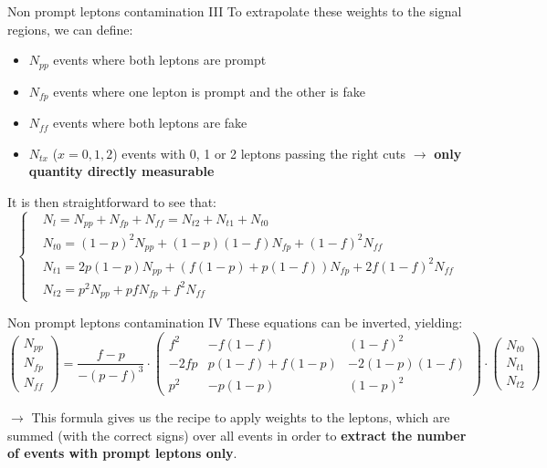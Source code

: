 \documentclass[8pt]{beamer}
\begin{document}
\begin{frame}{Non prompt leptons contamination III}
\justifying
To extrapolate these weights to the signal regions, we can define:
\begin{itemize}
\item $N_{pp}$ events where both leptons are prompt
\item $N_{fp}$ events where one lepton is prompt and the other is fake
\item $N_{ff}$ events where both leptons are fake
\item $N_{tx}$ ($x = 0,1,2$) events with 0, 1 or 2 leptons passing the right cuts $\rightarrow$ \textbf{only quantity directly measurable}
\end{itemize}
It is then straightforward to see that:
\begin{equation*}
\begin{cases}
& N_l = N_{pp} + N_{fp} + N_{ff} = N_{t2} + N_{t1} + N_{t0} \\
& N_{t0} = (1-p)^2N_{pp} + (1-p)(1-f)N_{fp}+(1-f)^2N_{ff} \\
& N_{t1} = 2p(1-p)N_{pp} + \left(f(1-p)+p(1-f)\right)N_{fp}+2f(1-f)^2N_{ff} \\
& N_{t2} = p^2N_{pp} + pfN_{fp}+f^2N_{ff}
\end{cases}
\end{equation*}
\end{frame}

\begin{frame}{Non prompt leptons contamination IV}
\justifying
These equations can be inverted, yielding: \\
\begin{equation*}
\begin{pmatrix}
N_{pp} \\ N_{fp} \\ N_{ff}
\end{pmatrix} = \frac{f-p}{-(p-f)^3} \cdot 
\begin{pmatrix}
f^2 & -f(1-f) & (1-f)^2 \\ -2fp & p(1-f)+f(1-p) & -2(1-p)(1-f) \\ p^2 & -p(1-p) & (1-p)^2
\end{pmatrix} \cdot 
\begin{pmatrix}
N_{t0} \\ N_{t1} \\ N_{t2}
\end{pmatrix}
\end{equation*} \vfill

$\rightarrow$ This formula gives us the recipe to apply weights to the leptons, which are summed (with the correct signs) over all events in order to \textbf{extract the number of events with prompt leptons only}. \vfill
\end{frame}
\end{document}

